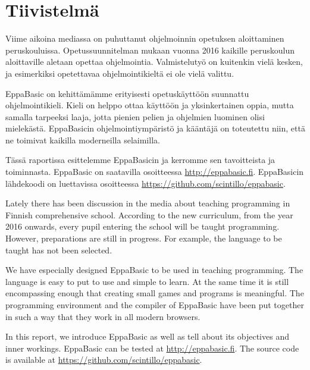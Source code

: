 
\section*{Tiivistelmä}
Viime aikoina mediassa on puhuttanut
ohjelmoinnin opetuksen aloittaminen
peruskouluissa.
Opetussuunnitelman mukaan vuonna
2016 kaikille peruskoulun aloittaville
aletaan opettaa ohjelmointia.
Valmistelutyö on kuitenkin vielä kesken,
ja esimerkiksi opetettavaa
ohjelmointikieltä ei ole vielä valittu.

EppaBasic on kehittämämme erityisesti
opetuskäyttöön suunnattu
ohjelmointikieli.
Kieli on helppo ottaa käyttöön
ja yksinkertainen oppia,
mutta samalla tarpeeksi laaja,
jotta pienien pelien ja ohjelmien
luominen olisi mielekästä.
EppaBasicin ohjelmointiympäristö ja kääntäjä
on toteutettu niin, että ne toimivat
kaikilla moderneilla selaimilla.

Tässä raportissa esittelemme EppaBasicin
ja kerromme sen tavoitteista ja toiminnasta.
EppaBasic on saatavilla osoitteessa \url{http://eppabasic.fi}.
EppaBasicin lähdekoodi on luettavissa
osoitteessa \url{https://github.com/scintillo/eppabasic}.

\vspace{50px}

Lately there has been discussion
in the media
about teaching programming in
Finnish comprehensive school.
According to the new curriculum,
from the year 2016 onwards,
every pupil entering the school
will be taught programming.
However, preparations
are still in progress.
For example, the language to
be taught has not been selected.

We have especially designed EppaBasic to be
used in teaching programming.
The language is easy to put to use
and simple to learn.
At the same time it is still
encompassing enough that
creating small games and programs
is meaningful.
The programming environment
and the compiler of EppaBasic
have been put together in such
a way that they work in all
modern browsers.

In this report, we introduce EppaBasic
as well as tell about its objectives and inner
workings.
EppaBasic can be tested at
\url{http://eppabasic.fi}.
The source code is available at
\url{https://github.com/scintillo/eppabasic}.